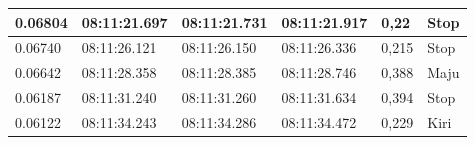 \begin{longtable}{|l|l|l|l|l|l|}
  0.06804                                                                                                 & 08:11:21.697                                                                                           & 08:11:21.731                                                                                               & 08:11:21.917                                                                                            & 0,22                                               & Stop                                              \\ \hline
  0.06740                                                                                                 & 08:11:26.121                                                                                           & 08:11:26.150                                                                                               & 08:11:26.336                                                                                            & 0,215                                              & Stop                                              \\ \hline
  0.06642                                                                                                 & 08:11:28.358                                                                                           & 08:11:28.385                                                                                               & 08:11:28.746                                                                                            & 0,388                                              & Maju                                              \\ \hline
  0.06187                                                                                                 & 08:11:31.240                                                                                           & 08:11:31.260                                                                                               & 08:11:31.634                                                                                            & 0,394                                              & Stop                                              \\ \hline
  0.06122                                                                                                 & 08:11:34.243                                                                                           & 08:11:34.286                                                                                               & 08:11:34.472                                                                                            & 0,229                                              & Kiri                                              \\ \hline

\end{longtable}
